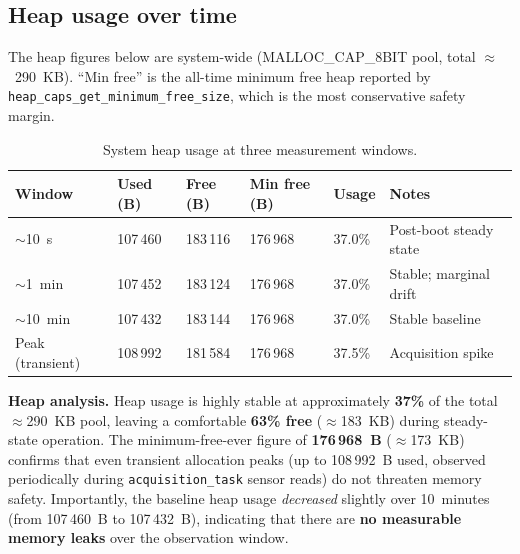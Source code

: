 \documentclass[11pt,a4paper]{article}
\newcommand{\rowhdr}{\rowcolor{tablehdr}}
\begin{document}
\newpage

\subsection{Heap usage over time}

The heap figures below are system-wide (MALLOC\_CAP\_8BIT pool, total $\approx$~290~KB).
``Min free'' is the all-time minimum free heap reported by
\texttt{heap\_caps\_get\_minimum\_free\_size}, which is the most conservative safety margin.

\vspace{5pt}
{\footnotesize
\setlength{\tabcolsep}{4pt}
\renewcommand{\arraystretch}{1.1}

\setlength\LTleft{0pt}
\begin{longtable}{@{}p{2.6cm}p{2.3cm}p{2.3cm}p{2.5cm}p{1.5cm}p{3.5cm}@{}}
\caption{System heap usage at three measurement windows.\label{tab:heap}}\\
\rowhdr
\textbf{Window} &
\textbf{Used (B)} &
\textbf{Free (B)} &
\textbf{Min free (B)} &
\textbf{Usage} &
\textbf{Notes} \\
\midrule
\endhead
$\sim$10~s  & 107\,460 & 183\,116 & 176\,968 & 37.0\% & Post-boot steady state \\
$\sim$1~min & 107\,452 & 183\,124 & 176\,968 & 37.0\% & Stable; marginal drift \\
$\sim$10~min & 107\,432 & 183\,144 & 176\,968 & 37.0\% & Stable baseline \\
Peak (transient) & 108\,992 & 181\,584 & 176\,968 & 37.5\% & Acquisition spike \\
\bottomrule
\end{longtable}

}

\vspace{5pt}
\begin{mdframed}[style=infoboxstyle]
\textbf{Heap analysis.}
Heap usage is highly stable at approximately \textbf{37\%} of the total $\approx$290~KB pool,
leaving a comfortable \textbf{63\% free} ($\approx$183~KB) during steady-state operation.
The minimum-free-ever figure of \textbf{176\,968~B} ($\approx$173~KB) confirms that even
transient allocation peaks (up to 108\,992~B used, observed periodically during
\texttt{acquisition\_task} sensor reads) do not threaten memory safety.
Importantly, the baseline heap usage \emph{decreased} slightly over 10~minutes (from 107\,460~B
to 107\,432~B), indicating that there are \textbf{no measurable memory leaks} over the
observation window.
\end{mdframed}
\end{document}
